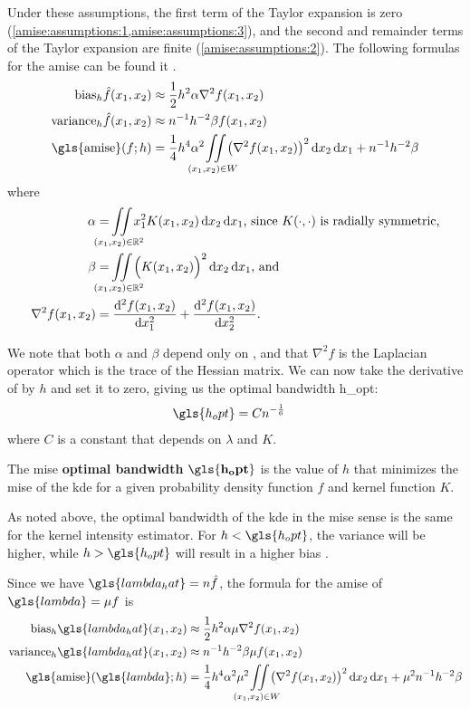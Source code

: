 Under these assumptions,
the first term of the Taylor expansion is zero (\cref{amise:assumptions:1,amise:assumptions:3}),
and the second and remainder terms of the Taylor expansion are finite (\cref{amise:assumptions:2}).
The following formulas for the \gls{amise} can be found it \citet[Section 4.3]{silverman1986density}.
\begin{align}
    \mbox{bias}_h \hat{f} \xvec%
        & \approx \frac{1}{2} h^{2} \alpha \nabla^2 f \xvec \nonumber \\%
    \mbox{variance}_h \hat{f} \xvec%
        & \approx n^{-1} h^{-2} \beta f \xvec \nonumber \\%
    \mbox{\gls{amise}}(f; h)%
        & = \frac{1}{4} h^{4} \alpha^2 \iintW{\left( \nabla^2 f \xvec \right)^2 }%
            + n^{-1} h^{-2} \beta \label{eq:amisef}%
\end{align}
where
\begin{align}
    \alpha & = \iintR{x_1^2 K(x_1,x_2)} \text{, since}~K\dotdot~\text{is radially symmetric,} \nonumber \\
    \beta & = \iintR{\Big( K(x_1,x_2) \Big)^2} \text{, and} \nonumber \\
    \nabla^2 f \xvec & = \frac{\diffsq{f}\xvec}{\diff{x_1^2}} + \frac{\diffsq{f}\xvec}{\diff{x_2^2}} \nonumber \text{.}
\end{align}

We note that both $\alpha$ and $\beta$ depend only on \Kdots,
and that $\nabla^2 f$ is the Laplacian operator which is the trace of the Hessian matrix.
We can now take the derivative of  by $h$ and set it to zero,
giving us the optimal bandwidth \gls{h_opt}:
\begin{align}
    \gls{h_opt} & = C n^{-\frac{1}{6}}
\end{align}
where $C$ is a constant that depends on $\lambda$ and $K$.
\begin{defn}
    The \gls{mise} \textbf{optimal bandwidth} $\mathbf{\gls{h_opt}}$ is the value of $h$ that minimizes the \gls{mise} of the \gls{kde} for a given probability density function $f$ and kernel function $K$.
\end{defn}
As noted above,
the optimal bandwidth of the \gls{kde} in the \gls{mise} sense is the same for the \gls{kernel intensity estimator}.
For $h < \gls{h_opt}$, the variance will be higher, while $h > \gls{h_opt}$ will result in a higher bias .

Since we have $\gls{lambda_hat} = n \hat{f}$,
the formula for the \gls{amise} of $\gls{lambda} = \mu f$ is
\begin{align}
    \mbox{bias}_h \gls{lambda_hat} \xvec%
        & \approx \frac{1}{2} h^{2} \alpha \mu \nabla^2 f \xvec \nonumber \\%
    \mbox{variance}_h  \gls{lambda_hat} \xvec%
        & \approx n^{-1} h^{-2} \beta \mu f \xvec \nonumber \\%
    \mbox{\gls{amise}}(\gls{lambda}; h)%
        & = \frac{1}{4} h^{4} \alpha^2 \mu^2 \iintW{\left( \nabla^2 f \xvec \right)^2 }%
            + \mu^2 n^{-1} h^{-2} \beta \label{eq:amiselambda}%
\end{align}


